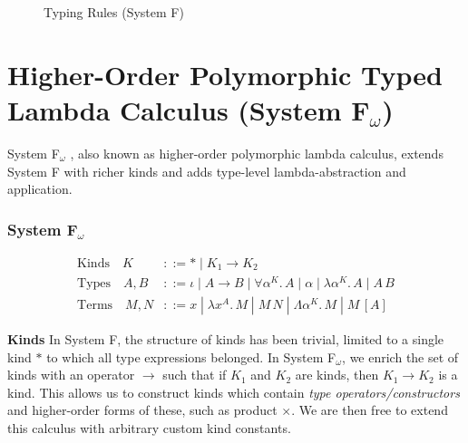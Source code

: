 \documentclass[acmsmall, 9pt]{article}
\begin{document}
\begin{figure}[H]
\flushleft {}
\caption{Typing Rules (System F)}
\end{figure}


\section{Higher-Order Polymorphic Typed Lambda Calculus (System F$_\omega$)}
System F$_\omega$ \cite{cambridge-lambda-calc, pierce2002types}, also known as higher-order polymorphic lambda calculus, extends System F with richer kinds and adds type-level lambda-abstraction and application.


\subsubsection{System F$_\omega$}
\begin{align*}
  \text{Kinds} \quad K &::= * \; | \; K_1 \rightarrow K_2\\
  \text{Types} \quad  A, B &::= \iota \; | \;  A \rightarrow B \; | \; \forall \alpha^K . \, A\; | \; \alpha \; | \; \lambda \alpha^K. \, A \; | \; A \, B\\
  \text{Terms} \quad M, N &::= x \; | \; \lambda x^A . \, M \; | \; M \, N  \; | \; \Lambda \alpha^K . \, M \; | \; M \, [A]
\end{align*}

\noindent
\textbf{Kinds} In System F, the structure of kinds has been trivial, limited to a single kind $*$ to which all type expressions belonged. In System F$_\omega$, we enrich the set of kinds with an operator $\rightarrow$ such that if $K_1$ and $K_2$ are kinds, then $K_1 \rightarrow K_2$ is a kind. This allows us to construct kinds which contain \textit{type operators/constructors} and higher-order forms of these, such as product $\times$. We are then free to extend this calculus with arbitrary custom kind constants.
\end{document}
